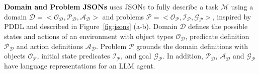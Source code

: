 \vspace{-0.5em}

\vspace{-0.5em}




\textbf{Domain and Problem JSONs} \robotouille{} uses JSONs to fully describe a task $\mathcal{M}$ using a domain $\mathcal{D} = <\mathcal{O}_\mathcal{D}, \mathcal{P}_\mathcal{D}, \mathcal{A}_\mathcal{D}>$ and problems $\mathcal{P} = <\mathcal{O}_\mathcal{P}, \mathcal{I}_\mathcal{P}, \mathcal{G}_\mathcal{P}>$, inspired by PDDL \citep{aeronautiques1998pddl} and described in Figure~\ref{fig:jsons} (a-b). Domain $\mathcal{D}$ defines the possible states and actions of an environment with object types $\mathcal{O}_\mathcal{D}$, predicate definition $\mathcal{P}_\mathcal{D}$ and action definitions $\mathcal{A}_\mathcal{D}$. Problem $\mathcal{P}$ grounds the domain definitions with objects $\mathcal{O}_\mathcal{P}$, initial state predicates $\mathcal{I}_\mathcal{P}$, and goal $\mathcal{G}_\mathcal{P}$. In addition, $\mathcal{P}_\mathcal{D}$, $\mathcal{A}_\mathcal{D}$ and $\mathcal{G}_\mathcal{P}$ have language representations for an LLM agent.

